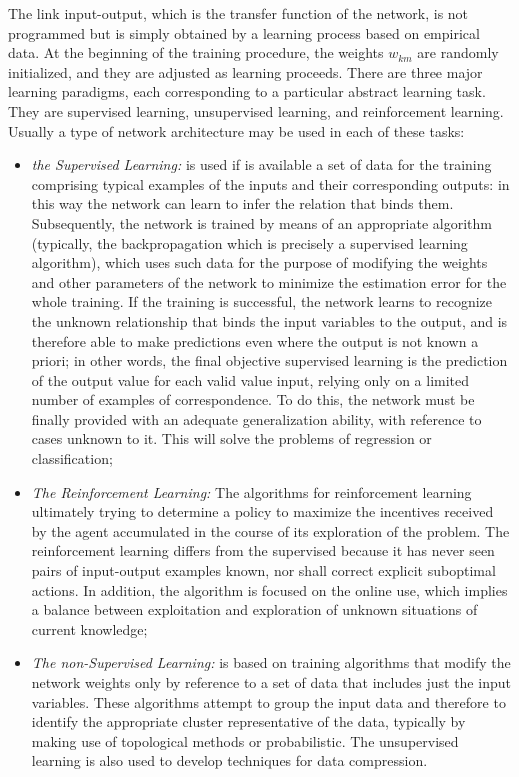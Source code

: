 \vspace{0.5cm}
The link input-output, which is the transfer function of the network, is not programmed but is simply obtained by a learning process based on empirical data. At the beginning of the training procedure, the weights ${ w }_{ km }$ are randomly initialized, and they are adjusted as learning proceeds. 
There are three major learning paradigms, each corresponding to a particular abstract learning task.
They are supervised learning, unsupervised learning, and reinforcement learning. Usually a type of
network architecture may be used in each of these tasks:
\begin{itemize}
	\item \textit{the Supervised Learning:} is used if is available a set of data for the training comprising typical examples of the inputs and their corresponding outputs: in this way the network can learn to infer the relation that binds them. Subsequently, the network is trained by means of an appropriate algorithm (typically, the backpropagation which is precisely a supervised learning algorithm), which uses such data for the purpose of modifying the weights and other parameters of the network to minimize the estimation error for the whole training. If the training is successful, the network learns to recognize the unknown relationship that binds the input variables to the output, and is therefore able to make predictions even where the output is not known a priori; in other words, the final objective supervised learning is the prediction of the output value for each valid value input, relying only on a limited number of examples of correspondence. To do this, the network must be finally provided with an adequate generalization ability, with reference to cases unknown to it. This will solve the problems of regression or classification;
	
	\item \textit{The Reinforcement Learning:} The algorithms for reinforcement learning ultimately trying to determine a policy to maximize the incentives	received by the agent accumulated in the course of its exploration of the problem. The reinforcement learning differs from the supervised because it has never seen pairs of input-output examples known, nor shall correct explicit suboptimal actions.
	In addition, the algorithm is focused on the online use, which implies a balance between exploitation and exploration of unknown situations of current knowledge;
	
	\item \textit{The non-Supervised Learning:} is based on training algorithms that modify the network weights only	by reference to a set of data that includes just the input variables. These algorithms attempt to group the input data and therefore to identify the appropriate cluster representative of the data, typically by making use of topological methods or probabilistic. The unsupervised learning is also used to develop techniques for data compression.
	
\end{itemize}

